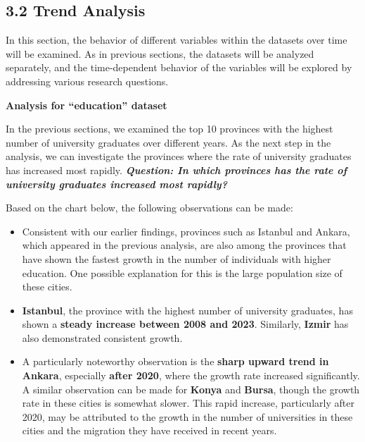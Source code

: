 \documentclass[
  11pt,
  a4paper,
  DIV=11,
  numbers=noendperiod]{scrartcl}
\begin{document}
\subsection{3.2 Trend Analysis}\label{trend-analysis}

In this section, the behavior of different variables within the datasets
over time will be examined. As in previous sections, the datasets will
be analyzed separately, and the time-dependent behavior of the variables
will be explored by addressing various research questions.

\textbf{Analysis for ``education'' dataset}

In the previous sections, we examined the top 10 provinces with the
highest number of university graduates over different years. As the next
step in the analysis, we can investigate the provinces where the rate of
university graduates has increased most rapidly.
{\textbf{\emph{Question: In which provinces has the rate of university
graduates increased most rapidly?}}}

Based on the chart below, the following observations can be made:

\begin{itemize}
\item
  Consistent with our earlier findings, provinces such as Istanbul and
  Ankara, which appeared in the previous analysis, are also among the
  provinces that have shown the fastest growth in the number of
  individuals with higher education. One possible explanation for this
  is the large population size of these cities.
\item
  {\textbf{Istanbul}}, the province with the highest number of
  university graduates, has shown a {\textbf{steady increase between
  2008 and 2023}}. Similarly, {\textbf{Izmir}} has also demonstrated
  consistent growth.
\item
  A particularly noteworthy observation is the {\textbf{sharp upward
  trend in Ankara}}, especially {\textbf{after 2020}}, where the growth
  rate increased significantly. A similar observation can be made for
  {\textbf{Konya}} and {\textbf{Bursa}}, though the growth rate in these
  cities is somewhat slower. This rapid increase, particularly after
  2020, may be attributed to the growth in the number of universities in
  these cities and the migration they have received in recent years.
\end{itemize}
\end{document}
